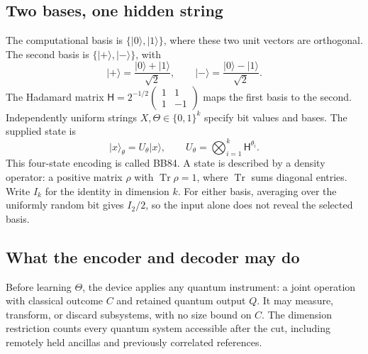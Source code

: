 \documentclass[11pt,a4paper]{article}
\newcommand{\Tr}{\operatorname{Tr}}
\newcommand{\ket}[1]{\lvert #1\rangle}
\newcommand{\HH}{\mathsf H}
\begin{document}
\subsection{Two bases, one hidden string}
The computational basis is $\{\ket0,\ket1\}$, where these two unit vectors are orthogonal. The second basis is $\{\ket+,\ket-\}$, with
\[
\ket+=\frac{\ket0+\ket1}{\sqrt2},\qquad
\ket-=\frac{\ket0-\ket1}{\sqrt2}.
\]
The Hadamard matrix $\HH=2^{-1/2}\left(\begin{smallmatrix}1&1\\1&-1\end{smallmatrix}\right)$ maps the first basis to the second. Independently uniform strings $X,\Theta\in\{0,1\}^k$ specify bit values and bases. The supplied state is
\[
\ket{x}_\theta=U_\theta\ket{x},\qquad
U_\theta=\bigotimes_{i=1}^k \HH^{\theta_i}.
\]
This four-state encoding is called BB84. A state is described by a density operator: a positive matrix $\rho$ with $\Tr\rho=1$, where $\Tr$ sums diagonal entries. Write $I_k$ for the identity in dimension $k$. For either basis, averaging over the uniformly random bit gives $I_2/2$, so the input alone does not reveal the selected basis.

\begin{center}
\end{center}

\subsection{What the encoder and decoder may do}
Before learning $\Theta$, the device applies any quantum instrument: a joint operation with classical outcome $C$ and retained quantum output $Q$. It may measure, transform, or discard subsystems, with no size bound on $C$. The dimension restriction counts every quantum system accessible after the cut, including remotely held ancillas and previously correlated references.
\end{document}
